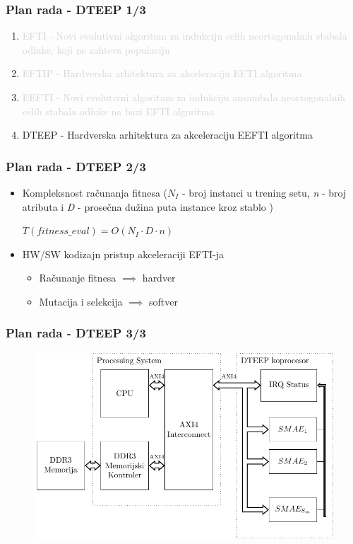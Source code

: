 \documentclass{beamer}
\newcommand{\light}[1]{\textcolor{lightgray}{#1}}
\begin{document}

\begin{frame}
\frametitle{Plan rada - DTEEP 1/3}
\begin{enumerate}
\setlength{\itemsep}{\fill}
\item\light{EFTI - Novi evolutivni algoritam za indukciju celih neortogonalnih stabala
odluke, koji ne zahteva populaciju}
\item\light{EFTIP - Hardverska arhitektura za akceleraciju EFTI algoritma}
\item\light{EEFTI - Novi evolutivni algoritam za indukciju ansambala neortogonalnih celih
stabala odluke na bazi EFTI algoritma}
\item DTEEP - Hardverska arhitektura za akceleraciju EEFTI algoritma
\end{enumerate}
\end{frame}


\begin{frame}
\frametitle{Plan rada - DTEEP 2/3}
\begin{itemize}
\setlength{\itemsep}{\fill}
\item Kompleksnost računanja fitnesa (\(N_{I}\) - broj instanci u trening setu, \emph{n} - 
broj atributa i \emph{D} - prosečna dužina puta instance kroz stablo )\\
\vspace{1em}
\centerline{$T(fitness\_eval) = O(N_{I}\cdot D\cdot n)$}
\item HW/SW kodizajn pristup akceleraciji EFTI-ja
\begin{itemize}
\item Računanje fitnesa $\implies$ hardver
\item Mutacija i selekcija $\implies$ softver
\end{itemize}
\end{itemize}
\end{frame}


\begin{frame}[fragile]
\frametitle{Plan rada - DTEEP 3/3}
\begin{figure}
\includegraphics[width=0.9\linewidth]{dteep_architecture.pdf}
\end{figure}
\end{frame}
\end{document}
